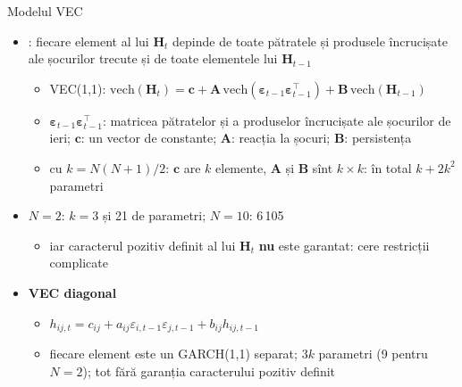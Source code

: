 \begin{frame}{Modelul VEC}
\itemsize{\footnotesize}
\begin{itemize}
    \item {}: fiecare element al lui $\mathbf{H}_t$ depinde de toate pătratele și produsele încrucișate ale șocurilor trecute și de toate elementele lui $\mathbf{H}_{t-1}$
    \begin{itemize}
        \item VEC(1,1): $\mathrm{vech}(\mathbf{H}_t) = \mathbf{c} + \mathbf{A}\,\mathrm{vech}(\boldsymbol{\varepsilon}_{t-1}\boldsymbol{\varepsilon}_{t-1}^\top) + \mathbf{B}\,\mathrm{vech}(\mathbf{H}_{t-1})$
        \item $\boldsymbol{\varepsilon}_{t-1}\boldsymbol{\varepsilon}_{t-1}^\top$: matricea pătratelor și a produselor încrucișate ale șocurilor de ieri; $\mathbf{c}$: un vector de constante; $\mathbf{A}$: reacția la șocuri; $\mathbf{B}$: persistența
        \item cu $k = N(N+1)/2$: $\mathbf{c}$ are $k$ elemente, $\mathbf{A}$ și $\mathbf{B}$ sînt $k \times k$: în total $k + 2k^2$ parametri
    \end{itemize}
    \item $N = 2$: $k = 3$ și 21 de parametri; $N = 10$: 6\,105
    \begin{itemize}
        \item iar caracterul pozitiv definit al lui $\mathbf{H}_t$ \textbf{nu} este garantat: cere restricții complicate
    \end{itemize}
    \item \textbf{VEC diagonal}
    \begin{itemize}
        \item $h_{ij,t} = c_{ij} + a_{ij}\varepsilon_{i,t-1}\varepsilon_{j,t-1} + b_{ij}h_{ij,t-1}$
        \item fiecare element este un GARCH(1,1) separat; $3k$ parametri (9 pentru $N = 2$); tot fără garanția caracterului pozitiv definit
    \end{itemize}
\end{itemize}
\end{frame}

